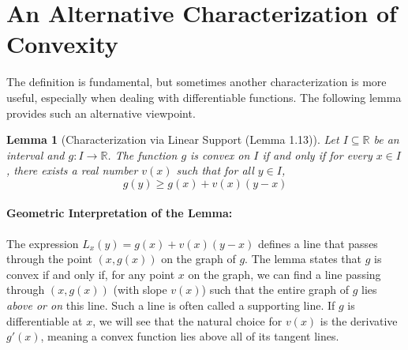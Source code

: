 \documentclass[11pt]{article}
\newtheorem{lemma}[theorem]{Lemma}
\theoremstyle{definition}
\theoremstyle{remark}
\begin{document}
\section{An Alternative Characterization of Convexity}

The definition is fundamental, but sometimes another characterization is more useful, especially when dealing with differentiable functions. The following lemma provides such an alternative viewpoint.

\begin{lemma}[Characterization via Linear Support (Lemma 1.13)] \label{lem:linear_support}
Let $I \subseteq \mathbb{R}$ be an interval and $g: I \to \mathbb{R}$. The function $g$ is convex on $I$ if and only if for every $x \in I$, there exists a real number $v(x)$ such that for all $y \in I$,
\[
g(y) \ge g(x) + v(x)(y-x)
\]
\end{lemma}

\paragraph{Geometric Interpretation of the Lemma:}
The expression $L_x(y) = g(x) + v(x)(y-x)$ defines a line that passes through the point $(x, g(x))$ on the graph of $g$. The lemma states that $g$ is convex if and only if, for any point $x$ on the graph, we can find a line passing through $(x, g(x))$ (with slope $v(x)$) such that the entire graph of $g$ lies \emph{above or on} this line. Such a line is often called a supporting line. If $g$ is differentiable at $x$, we will see that the natural choice for $v(x)$ is the derivative $g'(x)$, meaning a convex function lies above all of its tangent lines.
\end{document}
